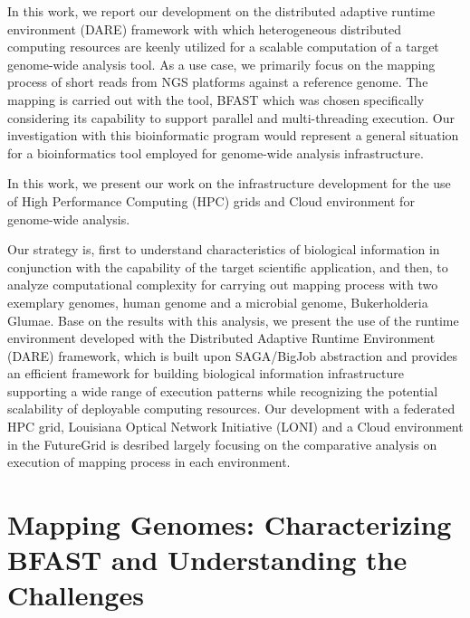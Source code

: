 \documentclass{acm_proc_article-sp}
\begin{document}
In this work, we report our development on the distributed adaptive
runtime environment (DARE) framework with which heterogeneous
distributed computing resources are keenly utilized for a scalable
computation of a target genome-wide analysis tool.  As a use case, we
primarily focus on the mapping process of short reads from NGS
platforms against a reference genome.  The mapping is carried out with
the tool, BFAST\cite{bfast2009, bfast2009b} which was chosen
specifically considering its capability to support parallel and
multi-threading execution.  Our investigation with this bioinformatic
program would represent a general situation for a bioinformatics tool
employed for genome-wide analysis infrastructure.

 In
this work, we present our work on the infrastructure development for
the use of High Performance Computing (HPC) grids and Cloud
environment for genome-wide analysis.

Our strategy is, first to understand characteristics of biological information in conjunction with the capability of the target scientific application, and then, to analyze computational complexity for carrying out mapping process with two exemplary genomes, human genome and a microbial genome, Bukerholderia Glumae.  Base on the results with this analysis, we present the use of the runtime environment developed with the Distributed Adaptive Runtime Environment (DARE) framework, which is built upon SAGA/BigJob abstraction and provides an efficient framework for building biological information infrastructure supporting a wide range of execution patterns while recognizing the potential scalability of deployable computing resources.  Our development with a federated HPC grid, Louisiana Optical Network Initiative (LONI) and a Cloud environment in the FutureGrid is desribed largely focusing on the comparative analysis on execution of mapping process in each environment. 

\section{Mapping Genomes: Characterizing BFAST and Understanding
  the Challenges}
\end{document}
